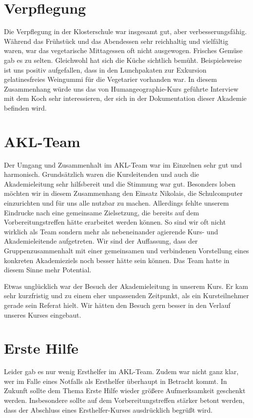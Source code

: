 \documentclass{scrartcl}
\begin{document}
\section*{Verpflegung}

Die Verpflegung in der Klosterschule war insgesamt gut, aber
verbesserungsf{\"a}hig. W{\"a}hrend das Fr{\"u}hst{\"u}ck und das Abendessen
sehr reichhaltig und vielf{\"a}ltig waren, war das vegetarische Mittagessen
oft nicht ausgewogen. Frisches Gem{\"u}se gab es zu selten. Gleichwohl hat
sich die K{\"u}che sichtlich bem{\"u}ht. Beispielsweise ist uns positiv
aufgefallen, dass in den Lunchpakaten zur Exkursion gelatinesfreies
Weingummi f{\"u}r die Vegetarier vorhanden war. In diesem Zusammenhang
w{\"u}rde uns das von Humangeographie-Kurs gef{\"u}hrte Interview mit dem Koch
sehr interessieren, der sich in der Dokumentation dieser Akademie befinden
wird.

\section*{AKL-Team}

Der Umgang und Zusammenhalt im AKL-Team war im Einzelnen sehr gut und harmonisch. Grunds{\"a}tzlich waren die Kursleitenden und auch die Akademieleitung sehr hilfsbereit und die Stimmung war gut. Besonders loben m{\"o}chten wir in diesem Zusammenhang den Einsatz Nikolais, die Schulcomputer einzurichten und f{\"u}r uns alle nutzbar zu machen. Allerdings fehlte unserem Eindrucke nach eine gemeinsame Zielsetzung, die bereits auf dem Vorbereitungstreffen h{\"a}tte erarbeitet werden k{\"o}nnen. So sind wir oft nicht wirklich als Team sondern mehr als nebeneinander agierende Kurs- und Akademieleitende aufgetreten. Wir sind der Auffassung, dass der Gruppenzusammenhalt mit einer gemeinsamen und verbindenen Vorstellung eines konkreten Akademieziels noch besser h{\"a}tte sein k{\"o}nnen. Das Team hatte in diesem Sinne mehr Potential.\medskip

Etwas ungl{\"u}cklich war der Besuch der Akademieleitung in unserem Kurs. Er kam sehr kurzfristig und zu einem eher unpassenden Zeitpunkt, als ein Kursteilnehmer gerade sein Referat hielt. Wir h{\"a}tten den Besuch gern besser in den Verlauf unseres Kurses eingebaut.\bigskip

\section*{Erste Hilfe}

Leider gab es nur wenig Ersthelfer im AKL-Team. Zudem war nicht ganz klar, wer im Falle eines Notfalls als Ersthelfer {\"u}berhaupt in Betracht kommt. In Zukunft sollte dem Thema Erste Hilfe wieder gr{\"o}{\ss}ere Aufmerksamkeit geschenkt werden. Insbesondere sollte auf dem Vorbereitungstreffen st{\"a}rker betont werden, dass der Abschluss eines Ersthelfer-Kurses ausdr{\"u}cklich begr{\"u}{\ss}t wird.\bigskip
\end{document}
